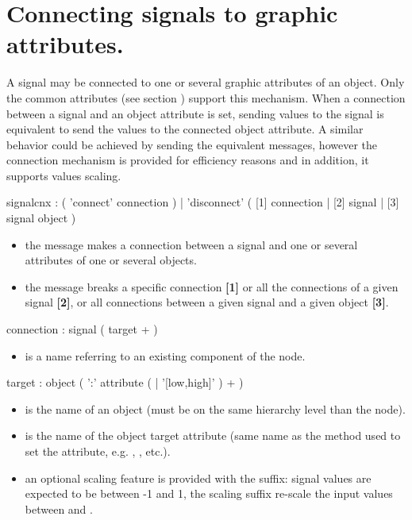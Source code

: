 \documentclass[a4paper,twoside]{report}
\newcommand{\sublevel}[1]	{\section{#1}}
\begin{document}
\sublevel{Connecting signals to graphic attributes.}
\label{signalcnx}

A signal may be connected to one or several graphic attributes of an object. Only the common attributes  (see section ) support this mechanism.
When a connection between a signal and an object attribute is set, sending values to the signal is equivalent to send the values to the connected object attribute. A similar behavior could be achieved by sending the equivalent messages, however the connection mechanism is provided for efficiency reasons and in addition, it supports values scaling. 


\begin{rail}
signalcnx : 	( 'connect'   connection )
			| 	'disconnect' ( [1] connection | [2] signal | [3]  signal object )
\end{rail}

\begin{itemize}
\item the  message makes a connection between a signal and one or several attributes of one or several objects.
\item the  message breaks a specific connection \textbf{[1]} or all the connections of a given signal \textbf{[2]}, or all connections between a given signal and a given object \textbf{[3]}.
\end{itemize}


\begin{rail}
connection : signal ( target + )
\end{rail}

\begin{itemize}
\item {} is a name referring to an existing component of the  node. 
\end{itemize}

\begin{rail}
target :  object ( ':' attribute ( | '[low,high]' ) + )
\end{rail}
\begin{itemize}
\item {} is the name of an object (must be on the same hierarchy level than the  node).
\item {} is the name of the object target attribute (same name as the method used to set the attribute, e.g. , , etc.).
\item an optional scaling feature is provided with the  suffix: signal values are expected to be between -1 and 1, the scaling suffix re-scale the input values between  and .
\end{itemize}
\end{document}
